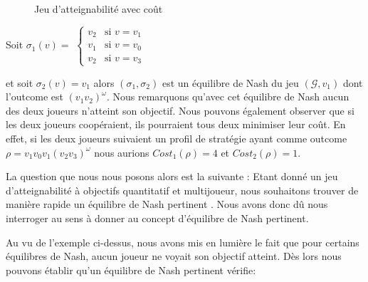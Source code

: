 \begin{figure}[ht!]
	\centering

	
	\caption{Jeu d'atteignabilité avec coût}
	\label{ex:patologique}
	

\end{figure}

Soit $\sigma _{1}(v) =$ $\begin{cases}
						v_{2} & \text{si } v = v_{1} \\
						v_{1 } & \text{si } v = v_{0} \\
						v_{2} & \text{si } v = v_{3} 
						\end{cases}$
						
						
						
\noindent et soit $\sigma _{2}(v) = v_{1}$ alors $(\sigma _{1},\sigma _{2})$ est un équilibre de Nash du jeu $(\mathcal{G},v_{1})$ dont l'outcome est $(v_{1}v_{2})^{\omega}$. Nous remarquons qu'avec cet équilibre de Nash aucun des deux joueurs n'atteint son objectif. Nous pouvons également observer que si les deux joueurs coopéraient, ils pourraient tous deux minimiser leur coût. En effet, si les deux joueurs suivaient un profil de stratégie ayant comme outcome $\rho = v_{1}v_{0}v_{1}(v_{2}v_{3})^{\omega} $ nous aurions $Cost_{1}(\rho) = 4$ et $Cost_{2}(\rho) = 1$.

La question que nous nous posons alors est la suivante : \og Etant donné un jeu d'atteignabilité à objectifs quantitatif et multijoueur, nous souhaitons trouver de manière rapide un équilibre de Nash pertinent \fg. Nous avons donc dû nous interroger au sens à donner au concept d'équilibre de Nash pertinent.

Au vu de l'exemple ci-dessus, nous avons mis en lumière le fait que pour certains équilibres de Nash, aucun joueur ne voyait son objectif atteint. Dès lors nous pouvons établir qu'un équilibre de Nash pertinent vérifie:

